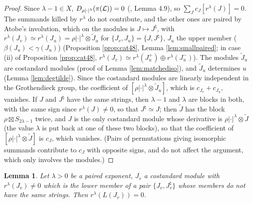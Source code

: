 \documentclass[a4paper,12pt,leqno]{amsart}
\theoremstyle{plain}
\newtheorem{lemma}[thm]{Lemma}
\theoremstyle{definition}
\begin{document}
\begin{proof}
Since $\lambda-1\in X$, $D_{\rho|\cdot|^\lambda}(\pi(\mathcal{L}))=0$ (\cite{Ato24}, Lemma 4.9), so
$\sum_Jc_J[r^\lambda(J)]=0$. The summands killed by $r^\lambda$ do not contribute, and the other ones are paired by
Atobe's involution, which on the modules is $J\mapsto J^\natural$, with $r^\lambda(J_v)\simeq
r^\lambda(J_u)=\rho|\cdot|^\lambda\otimes\widetilde J_u$ for $\{J_v,J_u\}=\{J,J^\natural\}$, $J_u$ the
upper member ($\beta(J_u)<\gamma(J_u)$)
(Proposition \ref{prop:cat48}, Lemma \ref{lem:smallpaired}; in case (ii) of Proposition \ref{prop:cat48},
$r^\lambda(J_v)\simeq r^\lambda(J_u^+)\oplus r^\lambda(J_u^-)$). The modules $\widetilde J_u$ are
costandard modules (proof of Lemma \ref{lem:matchediso}), and $\widetilde J_u$ determines $u$ (Lemma
\ref{lem:degtilde}). Since the costandard modules are linearly independent in the
Grothendieck group, the coefficient of $[\rho|\cdot|^\lambda\otimes\widetilde J_u]$, which is
$c_{J_v}+c_{J_u}$, vanishes. If $J$ and $J^\natural$ have the same strings, then $\lambda-1$ and $\lambda$ are
blocks in both, with the same sign since $r^\lambda(J)\neq0$, so that $J^\natural\simeq J$; then $\widetilde J$
has the block $\rho\boxtimes S_{2\lambda-1}$ twice, and $J$ is the only costandard module whose derivative is
$\rho|\cdot|^\lambda\otimes\widetilde J$ (the value $\lambda$ is put back at one of these two blocks), so that
the coefficient of $[\rho|\cdot|^\lambda\otimes\widetilde J]$ is $c_J$, which vanishes. (Pairs of permutations giving isomorphic summands contribute to $c_J$ with
opposite signs, and do not affect the argument, which only involves the modules.)
\end{proof}

\begin{lemma}\label{lem:lowersocle} Let $\lambda>0$ be a paired exponent, $J_v$ a costandard module
with $r^\lambda(J_v)\neq0$ which is the lower member of a pair $\{J_v,J_v^\natural\}$ whose members do not
have the same strings. Then $r^\lambda(L(J_v))=0$.
\end{lemma}
\end{document}
